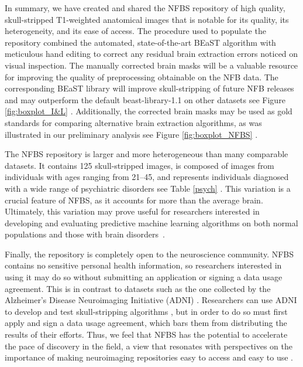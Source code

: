 \DIFaddend In summary, we have created and shared the NFBS repository of high quality, skull-stripped T1-weighted anatomical images that is notable for its quality, its heterogeneity, and its ease of access. The procedure used to populate the repository combined the automated, state-of-the-art BEaST algorithm with  meticulous hand editing to correct any residual brain extraction errors noticed on visual inspection. The manually corrected brain masks will be a valuable resource for improving the quality of preprocessing obtainable on the NFB data. The corresponding BEaST library will improve skull-stripping of future NFB releases and may outperform the default beast-library-1.1 on other datasets \DIFdelbegin %
\DIFdelend \DIFaddbegin \DIFadd{(}\DIFaddend see Figure \ref{fig:boxplot_I&L}\DIFdelbegin %
\DIFdelend \DIFaddbegin \DIFadd{)}\DIFaddend . Additionally, the corrected brain masks may be used as gold standards for comparing alternative brain extraction algorithms, as was illustrated in our preliminary analysis \DIFdelbegin %
\DIFdelend \DIFaddbegin \DIFadd{(}\DIFaddend see Figure \ref{fig:boxplot_NFBS}\DIFdelbegin %
\DIFdelend \DIFaddbegin \DIFadd{)}\DIFaddend .

The NFBS repository is larger and more heterogeneous than many comparable datasets. It contains 125 skull-stripped images, is composed of images from individuals with ages ranging from 21--45, and represents individuals diagnosed with a wide range of psychiatric disorders \DIFdelbegin %
\DIFdelend \DIFaddbegin \DIFadd{(}\DIFaddend see Table \ref{psych}\DIFdelbegin %
\DIFdelend \DIFaddbegin \DIFadd{)}\DIFaddend . This variation is a crucial feature of NFBS, as it accounts for more than the average brain. Ultimately, this variation may prove useful for researchers interested in developing and evaluating predictive machine learning algorithms on both normal populations and those with brain disorders~\cite{gabrieli2015prediction}.

Finally, the repository is completely open to the neuroscience community. NFBS contains no sensitive personal health information, so researchers interested in using it may do so without submitting an application or signing a data usage agreement. This is in contrast to datasets such as the one collected by the Alzheimer's Disease Neuroimaging Initiative (ADNI) \cite{pmid17476317}. Researchers can use ADNI to develop and test skull-stripping algorithms \cite{pmid21195780}, but in order to do so must first apply and sign a data usage agreement, which bars them from distributing the results of their efforts. Thus, we feel that NFBS has the potential to accelerate the pace of discovery in the field, a view that resonates with perspectives on the importance of making neuroimaging repositories easy to access and easy to use \cite{Nichols054262}.

